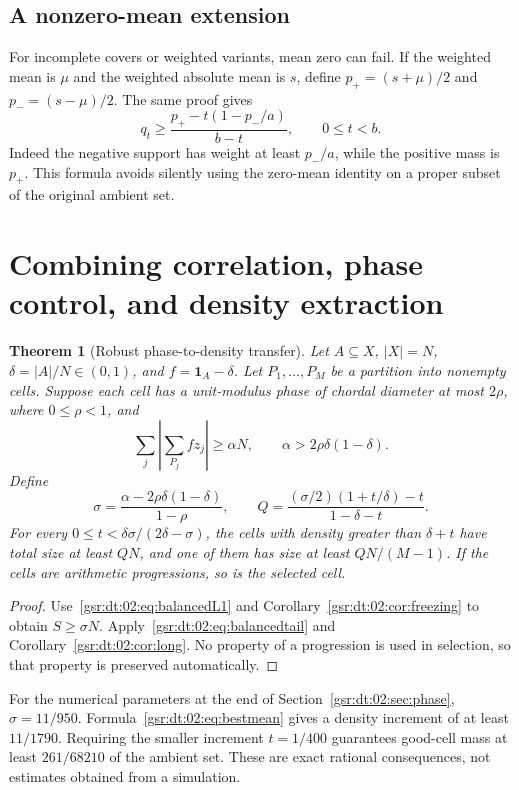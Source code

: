 \documentclass[11pt,letterpaper]{article}
\numberwithin{equation}{section}
\newtheorem{theorem}{Theorem}[section]
\theoremstyle{definition}
\theoremstyle{remark}
\newcommand{\one}{\mathbf 1}
\newcommand{\1}{\mathbf 1}
\newcommand{\srctag}[1]{\texorpdfstring{\enspace\textup{[#1]}}{ [#1]}}
\newcommand{\srcnote}[2]{\par\noindent{\small\textit{Source #1, delivered #2.}}\par}
\begin{document}
\subsection{A nonzero-mean extension}
For incomplete covers or weighted variants, mean zero can fail. If the weighted mean is $\mu$ and the weighted absolute mean is $s$, define $p_+=(s+\mu)/2$ and $p_-=(s-\mu)/2$. The same proof gives
\begin{equation}\label{gsr:dt:02:eq:nonzero}
 q_t\geq\frac{p_+-t(1-p_-/a)}{b-t},\qquad 0\leq t<b.
\end{equation}
Indeed the negative support has weight at least $p_-/a$, while the positive mass is $p_+$. This formula avoids silently using the zero-mean identity on a proper subset of the original ambient set.

\section[{Combining correlation, phase control, and density extraction\srctag{02}}]{Combining correlation, phase control, and density extraction}\label{gsr:dt:02:sec:d8}
\srcnote{02}{Section 8}

\begin{theorem}[Robust phase-to-density transfer]\label{gsr:dt:02:thm:transfer}
Let $A\subseteq X$, $|X|=N$, $\delta=|A|/N\in(0,1)$, and $f=\one_A-\delta$. Let $P_1,\ldots,P_M$ be a partition into nonempty cells. Suppose each cell has a unit-modulus phase of chordal diameter at most $2\rho$, where $0\leq\rho<1$, and
\[
 \sum_j\left|\sum_{P_j}fz_j\right|\geq\alpha N,
 \qquad \alpha>2\rho\delta(1-\delta).
\]
Define
\[
 \sigma=\frac{\alpha-2\rho\delta(1-\delta)}{1-\rho},\qquad
 Q=\frac{(\sigma/2)(1+t/\delta)-t}{1-\delta-t}.
\]
For every $0\leq t<\delta\sigma/(2\delta-\sigma)$, the cells with density greater than $\delta+t$ have total size at least $QN$, and one of them has size at least $QN/(M-1)$. If the cells are arithmetic progressions, so is the selected cell.
\end{theorem}
\begin{proof}
Use~\eqref{gsr:dt:02:eq:balancedL1} and Corollary~\ref{gsr:dt:02:cor:freezing} to obtain $S\geq\sigma N$. Apply~\eqref{gsr:dt:02:eq:balancedtail} and Corollary~\ref{gsr:dt:02:cor:long}. No property of a progression is used in selection, so that property is preserved automatically.
\end{proof}

For the numerical parameters at the end of Section~\ref{gsr:dt:02:sec:phase}, $\sigma=11/950$. Formula~\eqref{gsr:dt:02:eq:bestmean} gives a density increment of at least $11/1790$. Requiring the smaller increment $t=1/400$ guarantees good-cell mass at least $261/68210$ of the ambient set. These are exact rational consequences, not estimates obtained from a simulation.
\end{document}
